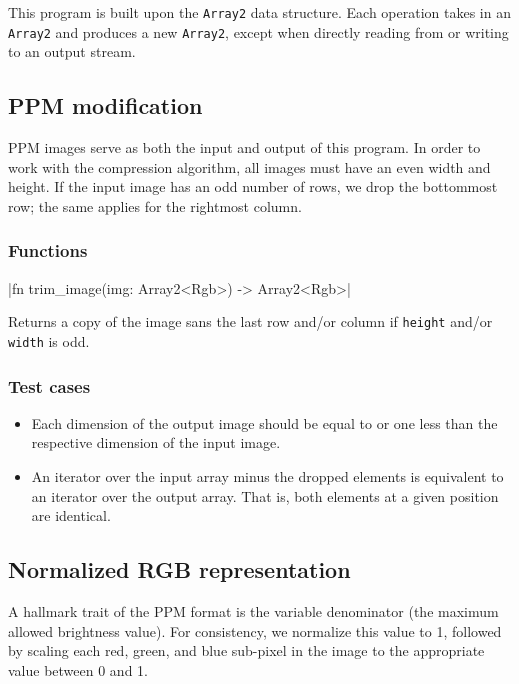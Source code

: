 \documentclass[12pt, letterpaper]{article}
\begin{document}
    This program is built upon the \verb|Array2| data structure.
    Each operation takes in an \verb|Array2| and produces a new \verb|Array2|, except when directly reading from or
    writing to an output stream.

    \subsection{PPM modification}

    PPM images serve as both the input and output of this program.
    In order to work with the compression algorithm, all images must have an even width and height.
    If the input image has an odd number of rows, we drop the bottommost row; the same applies for the
    rightmost column.

    \subsubsection{Functions}

    |fn trim_image(img: Array2<Rgb>) -> Array2<Rgb>|

    Returns a copy of the image sans the last row and/or column if \verb|height| and/or \verb|width| is odd.

    \subsubsection{Test cases}

    \begin{itemize}
        \item Each dimension of the output image should be equal to or one less than the respective dimension of the
        input image.
        \item An iterator over the input array minus the dropped elements is equivalent to an iterator over the output
        array.
        That is, both elements at a given position are identical.
    \end{itemize}

    \subsection{Normalized RGB representation}

    A hallmark trait of the PPM format is the variable denominator (the maximum allowed brightness value).
    For consistency, we normalize this value to 1, followed by scaling each red, green, and blue sub-pixel in the image
    to the appropriate value between 0 and 1.
\end{document}
